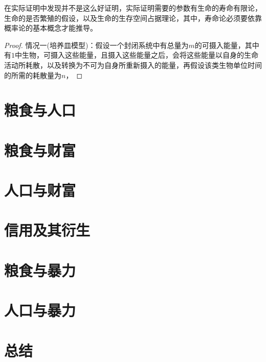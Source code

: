 在实际证明中发现并不是这么好证明，实际证明需要的参数有生命的寿命有限论，生命的是否繁殖的假设，以及生命的生存空间占据理论，其中，寿命论必须要依靠概率论的基本概念才能推导。
\begin{proof}
    情况一(培养皿模型)：假设一个封闭系统中有总量为$m$的可摄入能量，其中有$1$中生物，可摄入这些能量，且摄入这些能量之后，会将这些能量以自身的生命活动所耗散，以及转换为不可为自身所重新摄入的能量，再假设该类生物单位时间的所需的耗散量为$n$，
\end{proof}

\newpage

\section{粮食与人口}
\section{粮食与财富}
\section{人口与财富}
\section{信用及其衍生}
\section{粮食与暴力}
\section{人口与暴力}
\section{总结}

